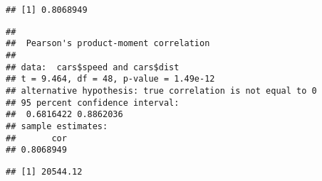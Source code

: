 \documentclass[]{article}
\newenvironment{Shaded}{\begin{snugshade}}{\end{snugshade}}
\newcommand{\KeywordTok}[1]{\textcolor[rgb]{0.13,0.29,0.53}{\textbf{#1}}}
\newcommand{\DecValTok}[1]{\textcolor[rgb]{0.00,0.00,0.81}{#1}}
\newcommand{\FloatTok}[1]{\textcolor[rgb]{0.00,0.00,0.81}{#1}}
\newcommand{\StringTok}[1]{\textcolor[rgb]{0.31,0.60,0.02}{#1}}
\newcommand{\CommentTok}[1]{\textcolor[rgb]{0.56,0.35,0.01}{\textit{#1}}}
\newcommand{\OperatorTok}[1]{\textcolor[rgb]{0.81,0.36,0.00}{\textbf{#1}}}
\newcommand{\NormalTok}[1]{#1}
\begin{document}
\begin{verbatim}
## [1] 0.8068949
\end{verbatim}

\begin{Shaded}
\end{Shaded}

\begin{verbatim}
## 
##  Pearson's product-moment correlation
## 
## data:  cars$speed and cars$dist
## t = 9.464, df = 48, p-value = 1.49e-12
## alternative hypothesis: true correlation is not equal to 0
## 95 percent confidence interval:
##  0.6816422 0.8862036
## sample estimates:
##       cor 
## 0.8068949
\end{verbatim}

\begin{Shaded}
\end{Shaded}

\begin{verbatim}
## [1] 20544.12
\end{verbatim}
\end{document}
